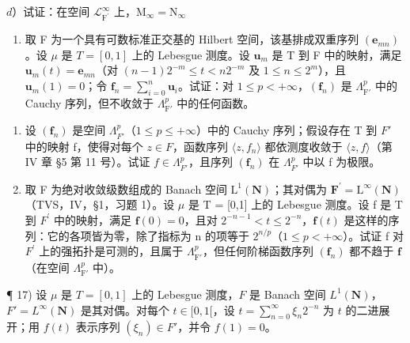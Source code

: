 \(d\)）试证：在空间 \(\mathcal{L}_{\mathrm{F}^{\prime}}^{\infty}\) 上，\(\mathrm{M}_{\infty} = \mathrm{N}_{\infty}\)

\begin{enumerate}
\def\labelenumi{\alph{enumi})}
\setcounter{enumi}{4}
\tightlist
\item
  取 F 为一个具有可数标准正交基的 Hilbert 空间，该基排成双重序列 \((\mathbf{e}_{mn})\)。设 \(\mu\) 是 \(T = [0,1]\) 上的 Lebesgue 测度。设 \(\mathbf{u}_m\) 是 T 到 F 中的映射，满足 \(\mathbf{u}_m(t) = \mathbf{e}_{mn}\)（对 \((n - 1)2^{-m} \leqslant t < n2^{-m}\) 及 \(1 \leqslant n \leqslant 2^m\)），且 \(\mathbf{u}_m(1) = 0\)；令 \(\mathbf{f}_n = \sum_{i=0}^{n} \mathbf{u}_i\)。试证：对 \(1 \leqslant p < +\infty\)，\((\mathbf{f}_n)\) 是 \(\Lambda_{\mathrm{F}'}^p\) 中的 Cauchy 序列，但不收敛于 \(\Lambda_{\mathrm{F}'}^p\) 中的任何函数。
\end{enumerate}

\begin{enumerate}
\def\labelenumi{\alph{enumi})}
\setcounter{enumi}{5}
\item
  设 \((\mathbf{f}_{n})\) 是空间 \(\Lambda_{F'}^{p}\)（\(1 \leqslant p \leqslant +\infty\)）中的 Cauchy 序列；假设存在 T 到 \(F'\) 中的映射 f，使得对每个 \(z \in F\)，函数序列 \(\langle z, f_{n} \rangle\) 都依测度收敛于 \(\langle z, f \rangle\)（第 IV 章 §5 第 11 号）。试证 \(f \in \Lambda_{F'}^{p}\)，且序列 \((\mathbf{f}_{n})\) 在 \(\Lambda_{F'}^{p}\) 中以 f 为极限。
\item
  取 F 为绝对收敛级数组成的 Banach 空间 \(\mathrm{L}^{1}(\mathbf{N})\)；其对偶为 \(\mathbf{F}^{\prime} = \mathrm{L}^{\infty}(\mathbf{N})\)（TVS，IV，§1，习题 1）。设 \(\mu\) 是 T = {[}0,1{]} 上的 Lebesgue 测度。设 f 是 T 到 \(F^{\prime}\) 中的映射，满足 \(\mathbf{f}(0) = 0\)，且对 \(2^{-n-1} < t \leqslant 2^{-n}\)，\(\mathbf{f}(t)\) 是这样的序列：它的各项皆为零，除了指标为 n 的项等于 \(2^{n/p}\)（\(1 \leqslant p < +\infty\)）。试证 f 对 \(F^{\prime}\) 上的强拓扑是可测的，且属于 \(\Lambda_{\mathrm{F}'}^p\)，但任何阶梯函数序列 \((\mathbf{f}_n)\) 都不趋于 \(\mathbf{f}\)（在空间 \(\Lambda_{\mathrm{F}'}^p\) 中）。
\end{enumerate}

¶ 17) 设 \(\mu\) 是 \(T = [0,1]\) 上的 Lebesgue 测度，\(F\) 是 Banach 空间 \(L^1(\mathbf{N})\)，\(F' = L^\infty(\mathbf{N})\) 是其对偶。对每个 \(t \in [0,1[\)，设 \(t = \sum_{n=0}^\infty \xi_n 2^{-n}\) 为 \(t\) 的二进展开；用 \(f(t)\) 表示序列 \((\xi_n) \in F'\)，并令 \(f(1) = 0\)。

